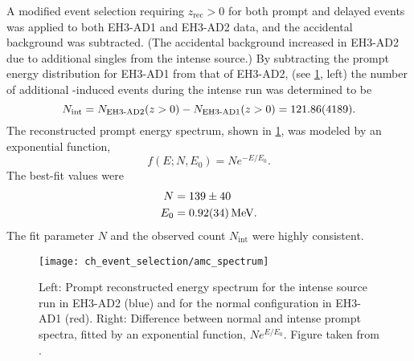 A modified event selection requiring $z_\text{rec} > 0$
for both prompt and delayed events
was applied to both EH3-AD1 and EH3-AD2 data,
and the accidental background was subtracted.
(The accidental background increased in EH3-AD2 due to additional singles
from the intense \amc{} source.)
By subtracting the prompt energy distribution for EH3-AD1 from that of EH3-AD2,
(see \cref{fig:amc_spectrum}, left)
the number of additional \amc{}-induced events during the intense run
was determined to be
\begin{equation}\label{eq:amc_intense}
    N_\text{int} = N_\text{EH3-AD2}(z > 0) - N_\text{EH3-AD1}(z > 0)
    = \num{121.86\pm41.89}.
\end{equation}
The reconstructed prompt energy spectrum, shown in \cref{fig:amc_spectrum},
was modeled by an exponential function,
\begin{equation}\label{eq:amc_spec_fit}
    f(E; N, E_0) = N e^{-E/E_0}.
\end{equation}
The best-fit values were
\begin{align}\label{eq:amc_spec_params}
    \begin{split}
        N &= 139\pm40 \\
        E_0 &= \SI{0.92\pm0.34}{\MeV}.
    \end{split}
\end{align}
The fit parameter $N$ and the observed count $N_\text{int}$
were highly consistent.

\begin{figure}
    \centering
    \texttt{[image: ch\_event\_selection/amc\_spectrum]}
    \caption[\amc{} prompt spectrum]{
        Left: Prompt reconstructed energy spectrum
        for the intense \amc{} source run in EH3-AD2 (blue)
        and for the normal configuration in EH3-AD1 (red).
        Right: Difference between normal and intense prompt spectra,
        fitted by an exponential function, $Ne^{E/E_0}$.
        Figure taken from \cite{nh2016technote}.
    }
    \label{fig:amc_spectrum}
\end{figure}

